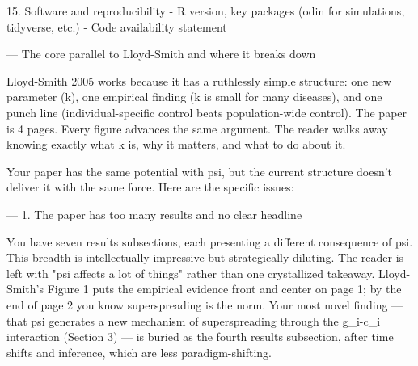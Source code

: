   15. Software and reproducibility
  - R version, key packages (odin for simulations, tidyverse, etc.)
  - Code availability statement






















    ---
  The core parallel to Lloyd-Smith and where it breaks down

  Lloyd-Smith 2005 works because it has a ruthlessly simple structure: one new parameter (k), one
  empirical finding (k is small for many diseases), and one punch line (individual-specific control
  beats population-wide control). The paper is 4 pages. Every figure advances the same argument. The
  reader walks away knowing exactly what k is, why it matters, and what to do about it.

  Your paper has the same potential with psi, but the current structure doesn't deliver it with the
  same force. Here are the specific issues:

  ---
  1. The paper has too many results and no clear headline

  You have seven results subsections, each presenting a different consequence of psi. This breadth is
   intellectually impressive but strategically diluting. The reader is left with "psi affects a lot
  of things" rather than one crystallized takeaway. Lloyd-Smith's Figure 1 puts the empirical
  evidence front and center on page 1; by the end of page 2 you know superspreading is the norm. Your
   most novel finding --- that psi generates a new mechanism of superspreading through the g_i-c_i
  interaction (Section 3) --- is buried as the fourth results subsection, after time shifts and
  inference, which are less paradigm-shifting.

